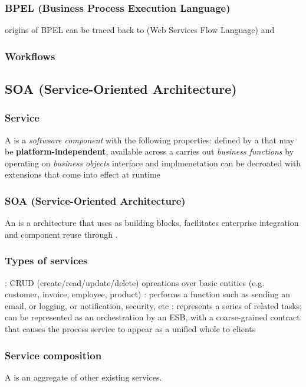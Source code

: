 \documentclass{myproc}
\begin{document}
\subsubsection{BPEL (Business Process Execution Language)}
\bit
\w origins of BPEL can be traced back to  (Web Services Flow
Language) and  
\eit

\subsubsection{Workflows}

\subsection{SOA (Service-Oriented Architecture)}
\subsubsection{Service}
A  is a {\em softwsare component\/} with the following properties:
\bit
\w defined by a  that may be {\bf platform-independent},
\w available across a 
\w carries out {\em business functions\/} by operating on {\em business
  objects\/}
\w interface and implmenetation can be decroated with extensions that come
into effect at runtime
\eit

\subsubsection{SOA (Service-Oriented Architecture)}
An  is a architecture that 
\bit
\w uses  as building blocks,
\w facilitates enterprise integration and component reuse through 
. 
\eit

\subsubsection{Types of services}
\bit
\w {}: CRUD (create/read/update/delete) opreations over basic
entities (e.g. customer, invoice, employee, product) 
\w {}: performs a function such as sending an email, or
logging, or notification, security, etc
\w {}: represents a series of related tasks; can be
represented as an orchestration by an ESB, with a coarse-grained contract that
causes the process service to appear as a unified whole to clients
\eit

\subsubsection{Service composition}
A  is an aggregate of other existing services. 
\end{document}
